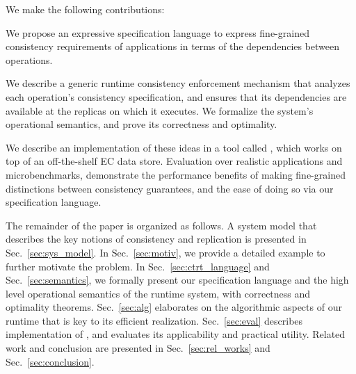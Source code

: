 We make the following contributions:
\begin{enumerate*}[label=(\roman*)]  
\item We propose an expressive specification language to express
  fine-grained consistency requirements of applications in terms of
  the dependencies between operations.

\item We describe a generic runtime consistency enforcement mechanism
  that analyzes each operation's consistency specification, and
  ensures that its dependencies are available at the replicas on which
  it executes.  We formalize the system's operational semantics, and
  prove its correctness and optimality.
    
  \item We describe an implementation of these ideas in a tool called
    \tool, which works on top of an off-the-shelf EC data store.
    Evaluation over realistic applications and microbenchmarks,
    demonstrate the performance benefits of making fine-grained
    distinctions between consistency guarantees, and the ease of doing
    so via our specification language.

\end{enumerate*}

The remainder of the paper is organized as follows.  A system model
that describes the key notions of consistency and replication is
presented in Sec.~\ref{sec:sys_model}.  In Sec.~\ref{sec:motiv}, we
provide a detailed example to further motivate the problem.  In
Sec.~\ref{sec:ctrt_language} and Sec.~\ref{sec:semantics}, we formally
present our specification language and the high level operational
semantics of the runtime system, with correctness and optimality
theorems.  Sec.~\ref{sec:alg} elaborates on the algorithmic aspects of
our runtime that is key to its efficient
realization. Sec.~\ref{sec:eval} describes implementation of \tool,
and evaluates its applicability and practical utility.  Related work
and conclusion are presented in Sec.~\ref{sec:rel_works} and
Sec.~\ref{sec:conclusion}.








